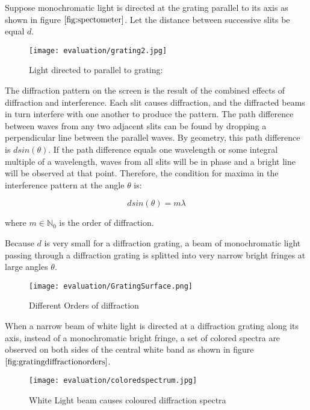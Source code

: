 Suppose monochromatic light is directed at the grating parallel to its axis as shown in figure $\ref{fig:spectometer}$. Let the distance between successive slits be equal $d$.

\begin{figure}[H]
  \centering
  \texttt{[image: evaluation/grating2.jpg]}
  \caption{Light directed to parallel to grating:}
  \label{fig:lighthitsgrating}
\end{figure}

The diffraction pattern on the screen is the result of the combined effects of diffraction and interference. Each slit causes diffraction, and the diffracted beams in turn interfere with one another to produce the pattern. The path difference between waves from any two adjacent slits can be found by dropping a perpendicular line between the parallel waves. By geometry, this path difference is $d sin(\theta)$. If the path difference equals one wavelength or some integral multiple of a wavelength, waves from all slits will be in phase and a bright line will be observed at that point. Therefore, the condition for maxima in the interference pattern at the angle $\theta$ is: 

\begin{equation}
 d sin(\theta) = m \lambda 
\label{eq:simplegratingequation}
\end{equation}

where $m \in \mathds{N}_0$ is the order of diffraction.

Because $d$ is very small for a diffraction grating, a beam of monochromatic light passing through a diffraction grating is splitted into very narrow bright fringes at large angles $\theta$.

\begin{figure}[H]
  \centering
  \texttt{[image: evaluation/GratingSurface.png]}
  \caption{Different Orders of diffraction}
\label{fig:gratingdiffractionorders}
\end{figure}

When a narrow beam of white light is directed at a diffraction grating along its axis, instead of a monochromatic bright fringe, a set of colored spectra are observed on both sides of the central white band as shown in figure $\ref{fig:gratingdiffractionorders}$.

\begin{figure}[H]
  \centering
  \texttt{[image: evaluation/coloredspectrum.jpg]}
  \caption{White Light beam causes coloured diffraction spectra}
  \label{fig:diffractionSpectrum}
\end{figure}

